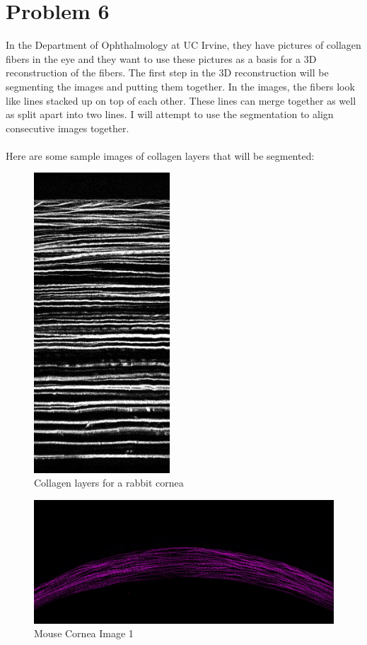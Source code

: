 \documentclass[11pt,psfig]{article}
\begin{document}
\newpage

\section*{Problem 6}

In the Department of Ophthalmology at UC Irvine, they have pictures of collagen fibers in the eye and they want to use these pictures as a basis for a 3D reconstruction of the fibers. The first step in the 3D reconstruction will be segmenting the images and putting them together. In the images, the fibers look like lines stacked up on top of each other. These lines can merge together as well as split apart into two lines. I will attempt to use the segmentation to align consecutive images together.\\
\\
Here are some sample images of collagen layers that will be segmented:
\begin{figure}[H]
\centering
\includegraphics[width=2in]{rabbit_central.jpg}
\caption{Collagen layers for a rabbit cornea}
\end{figure}

\begin{figure}[H]
\centering
\includegraphics[width=6in]{mouseCornea1.jpg}
\caption{Mouse Cornea Image 1}
\end{figure}
\end{document}

